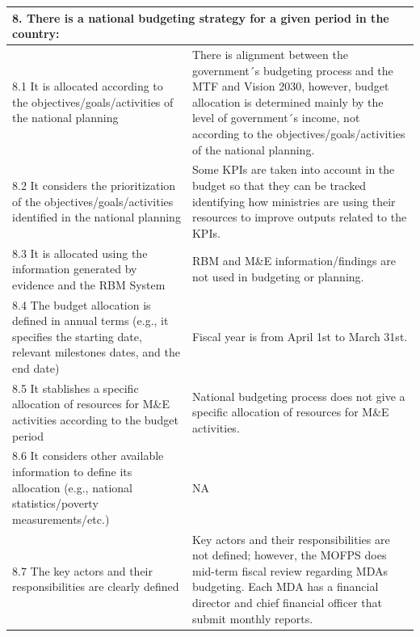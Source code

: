 \documentclass[
  10pt,
]{book}
\begin{document}
\begin{table}
\begin{tabular}[t]{l|l}
\hline
\multicolumn{2}{l}{\textbf{8. There is a national budgeting strategy for a given period in the country:}}\\
\hline
\hspace{1em}8.1 It is allocated according to the objectives/goals/activities of the national planning & There is alignment between the government´s budgeting process and the MTF and Vision 2030, however, budget allocation is determined mainly by the level of government´s income, not according to the objectives/goals/activities of the national planning.\\
\hline
\hspace{1em}8.2 It considers the prioritization of the objectives/goals/activities identified in the national planning & Some KPIs are taken into account in the budget so that they can be tracked identifying how ministries are using their resources to improve outputs related to the KPIs.\\
\hline
\hspace{1em}8.3 It is allocated using the information generated by evidence and the RBM System & RBM and M\&E information/findings are not used in budgeting or planning.\\
\hline
\hspace{1em}8.4 The budget allocation is defined in annual terms (e.g., it specifies the starting date, relevant milestones dates, and the end date) & Fiscal year is from April 1st to March 31st.\\
\hline
\hspace{1em}8.5 It stablishes a specific allocation of resources for M\&E activities according to the budget period & National budgeting process does not give a specific allocation of resources for M\&E activities.\\
\hline
\hspace{1em}8.6 It considers other available information to define its allocation (e.g., national statistics/poverty measurements/etc.) & NA\\
\hline
\hspace{1em}8.7 The key actors and their responsibilities are clearly defined & Key actors and their responsibilities are not defined; however, the MOFPS does mid-term fiscal review regarding MDAs budgeting. Each MDA has a financial director and chief financial officer that submit monthly reports.\\
\hline
\end{tabular}
\end{table}
\end{document}
